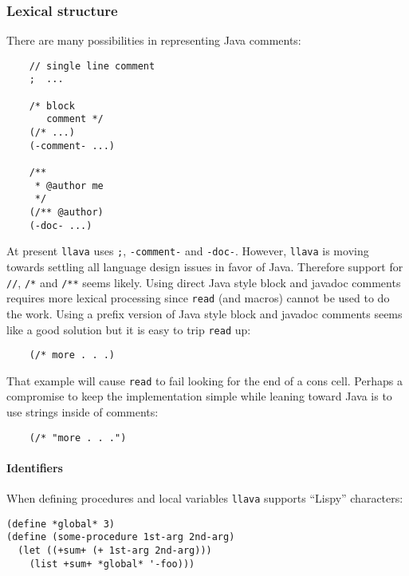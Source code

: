 \documentclass{acm-final/sig-alternate-modified}
\begin{document}
\subsubsection{Lexical structure}

There are many possibilities in representing Java comments:

\small
\begin{verbatim}
    // single line comment
    ;  ...

    /* block
       comment */
    (/* ...)
    (-comment- ...)

    /**
     * @author me
     */
    (/** @author)
    (-doc- ...)
\end{verbatim}
\normalsize

At present {\tt llava} uses {\tt ;}, {\tt -comment-} and {\tt -doc-}.
However, {\tt llava} is moving towards settling all language design
issues in favor of Java.  Therefore support for {\tt //}, {\tt /*} and
{\tt /**} seems likely.  Using direct Java style block and javadoc
comments requires more lexical processing since {\tt read} (and
macros) cannot be used to do the work.  Using a prefix version of Java
style block and javadoc comments seems like a good solution but it is
easy to trip {\tt read} up:

\small
\begin{verbatim}
    (/* more . . .)
\end{verbatim}
\normalsize

That example will cause {\tt read} to fail looking for the end of a
cons cell.  Perhaps a compromise to keep the implementation simple while leaning
toward Java is to use strings inside of comments:

\small
\begin{verbatim}
    (/* "more . . .")
\end{verbatim}
\normalsize

\paragraph{Identifiers}

When defining procedures and local variables {\tt llava} supports
``Lispy'' characters:

\small
\begin{verbatim}
(define *global* 3)
(define (some-procedure 1st-arg 2nd-arg)
  (let ((+sum+ (+ 1st-arg 2nd-arg)))
    (list +sum+ *global* '-foo)))
\end{verbatim}
\normalsize
\end{document}
